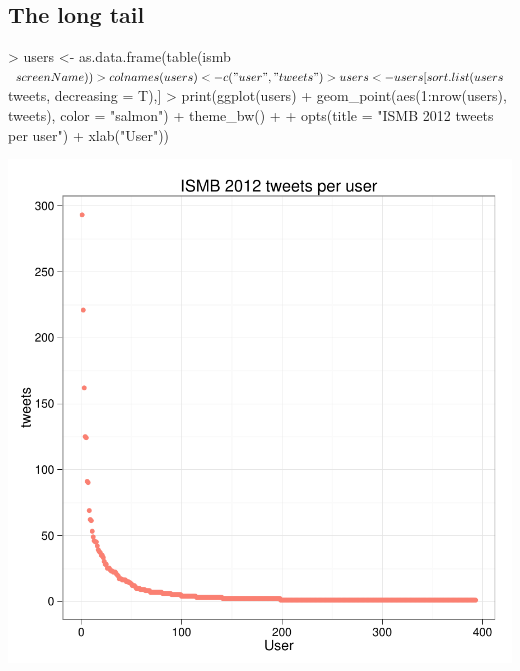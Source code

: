 \documentclass[a4paper,10pt]{article}
\begin{document}
\subsection{The long tail}
\begin{center}
\begin{Schunk}
\begin{Sinput}
> users <- as.data.frame(table(ismb$screenName))
> colnames(users) <- c("user", "tweets")
> users <- users[sort.list(users$tweets, decreasing = T),]
> print(ggplot(users) + geom_point(aes(1:nrow(users), tweets), color = "salmon") + theme_bw() + 
+   opts(title = "ISMB 2012 tweets per user") + xlab("User"))
\end{Sinput}
\end{Schunk}
\includegraphics{ismb-010}
\end{center}
\end{document}
